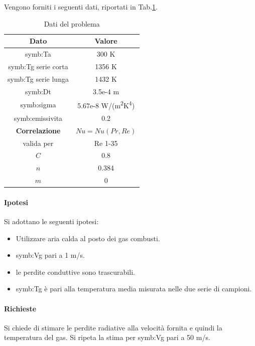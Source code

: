 Vengono forniti i seguenti dati, riportati in Tab.\ref{tab:datiirr}.
\begin{table}[H]
	\centering
	\begin{tabular}{c|c}
		\toprule
		\toprule
		\textbf{Dato} & \textbf{Valore}\\
		\midrule
		\midrule
		\gls{symb:Ta} & 300 K\\
		\midrule
		\gls{symb:Tg} serie corta & 1356 K \\
		\midrule
		\gls{symb:Tg} serie lunga & 1432 K \\
		\midrule
		\gls{symb:Dt} & 3.5e-4 m \\
		\midrule
		\gls{symb:sigma} & 5.67e-8 W/(m\textsuperscript{2}K\textsuperscript{4})\\
		\midrule
		\gls{symb:emissivita} & 0.2 \\
		\midrule
		\midrule
		\textbf{Correlazione} & $ Nu = Nu(Pr,Re) $\\
		valida per & Re 1-35 \\
		\midrule
		$C$ & 0.8 \\
		$n$ & 0.384 \\
		$m$ & 0 \\
		\bottomrule
		\bottomrule
	\end{tabular}
\caption{Dati del problema}
\label{tab:datiirr}
\end{table}

\paragraph{Ipotesi}
Si adottano le seguenti ipotesi:
\begin{itemize}
	\item Utilizzare aria calda al posto dei gas combusti.
	\item \gls{symb:Vg} pari a 1 m/s.
	\item le perdite conduttive sono trascurabili.
	\item \gls{symb:Tg} è pari alla temperatura media misurata nelle due serie di campioni.
\end{itemize}

\paragraph{Richieste}
Si chiede di stimare le perdite radiative alla velocità fornita e quindi la temperatura del gas. Si ripeta la stima per \gls{symb:Vg} pari a 50 m/s. 

